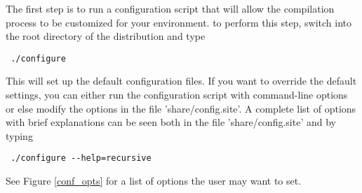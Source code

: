 The first step is to run a configuration script that will allow the
compilation process to be customized for your environment. to perform this
step, switch into the root directory of the distribution and type
{\color{Brown}
\begin{verbatim}
 ./configure 
\end{verbatim}
}
This will set up the default configuration files. If you want to override the
default settings, you can either run the configuration script with
command-line options or else modify the options in the file
'share/config.site'. A complete list of options with brief
explanations can be seen both in the file 'share/config.site' and by typing
{\color{Brown}
\begin{verbatim}
 ./configure --help=recursive 
\end{verbatim}
}
See Figure \ref{conf_opts} for a list of options the user may want to set. 

